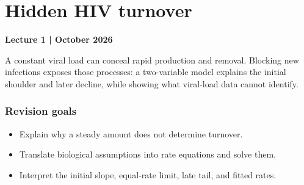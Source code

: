 \chapter[Hidden HIV turnover]{Hidden HIV turnover}\label{chap:lecture01}
\noindent\textbf{Lecture 1 \enspace| October 2026}

A constant viral load can conceal rapid production and removal. Blocking new infections exposes those processes: a two-variable model explains the initial shoulder and later decline, while showing what viral-load data cannot identify.

\subsection*{Revision goals}
\begin{itemize}
\item Explain why a steady amount does not determine turnover.
\item Translate biological assumptions into rate equations and solve them.
\item Interpret the initial slope, equal-rate limit, late tail, and fitted rates.
\end{itemize}

